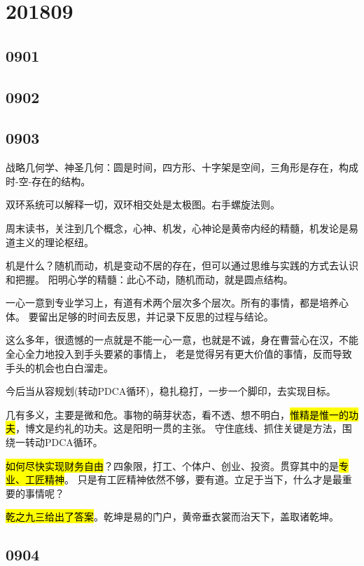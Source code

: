 \section{201809}

\subsection{0901}

\subsection{0902}

\subsection{0903}

战略几何学、神圣几何：圆是时间，四方形、十字架是空间，三角形是存在，构成时-空-存在的结构。

双环系统可以解释一切，双环相交处是太极图。右手螺旋法则。

周末读书，关注到几个概念，心神、机发，心神论是黄帝内经的精髓，机发论是易道主义的理论枢纽。

机是什么？随机而动，机是变动不居的存在，但可以通过思维与实践的方式去认识和把握。
阳明心学的精髓：此心不动，随机而动，就是圆点结构。

一心一意到专业学习上，有道有术两个层次多个层次。所有的事情，都是培养心体。
要留出足够的时间去反思，并记录下反思的过程与结论。

这么多年，很遗憾的一点就是不能一心一意，也就是不诚，身在曹营心在汉，不能全心全力地投入到手头要紧的事情上，
老是觉得另有更大价值的事情，反而导致手头的机会也白白溜走。

今后当从容规划(转动PDCA循环)，稳扎稳打，一步一个脚印，去实现目标。

几有多义，主要是微和危。事物的萌芽状态，看不透、想不明白，\hl{惟精是惟一的功夫}，博文是约礼的功夫。这是阳明一贯的主张。
守住底线、抓住关键是方法，围绕一转动PDCA循环。

\hl{如何尽快实现财务自由}？四象限，打工、个体户、创业、投资。贯穿其中的是\hl{专业、工匠精神}。
只是有工匠精神依然不够，要有道。立足于当下，什么才是最重要的事情呢？

\hl{乾之九三给出了答案}。乾坤是易的门户，黄帝垂衣裳而治天下，盖取诸乾坤。

\subsection{0904}

